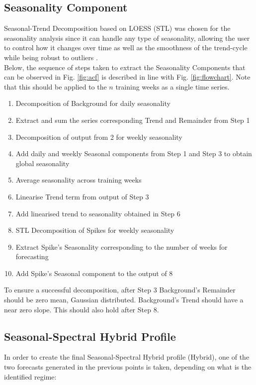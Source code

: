 \documentclass[conference, letterpaper]{IEEEtran}
\begin{document}
\subsection{Seasonality Component}
Seasonal-Trend Decomposition based on LOESS (STL) \cite{STL} was chosen for the seasonality analysis since it can handle any type of seasonality, allowing the user to control how it changes over time as well as the smoothness of the trend-cycle while being robust to outliers \cite{forecasting}.\\

Below, the sequence of steps taken to extract the Seasonality Components that can be observed in Fig. \ref{fig:acf} is described in line with Fig. \ref{fig:flowchart}. 
Note that this should be applied to the $n$ training weeks as a single time series.
\begin{enumerate}
	\item Decomposition of Background for daily seasonality
	\item Extract and sum the series corresponding Trend and Remainder from Step 1
	\item Decomposition of output from 2 for weekly seasonality
	\item Add daily and weekly Seasonal components from Step 1 and Step 3 to obtain global seasonality
	\item Average seasonality across training weeks
	\item Linearise Trend term from output of Step 3
	\item Add linearised trend to seasonality obtained in Step 6
	\item STL Decomposition of Spikes for weekly seasonality
	\item Extract Spike's Seasonality corresponding to the number of weeks for forecasting
	\item Add Spike's Seasonal component to the output of 8
\end{enumerate}
To ensure a successful decomposition, after Step 3  Background's Remainder should be zero mean, Gaussian distributed. Background's Trend should have a near zero slope. This should also hold after Step 8.
\subsection{Seasonal-Spectral Hybrid Profile}
In order to create the final Seasonal-Spectral Hybrid profile (Hybrid), one of the two forecasts generated in the previous points is taken, depending on what is the identified regime: 
\end{document}
